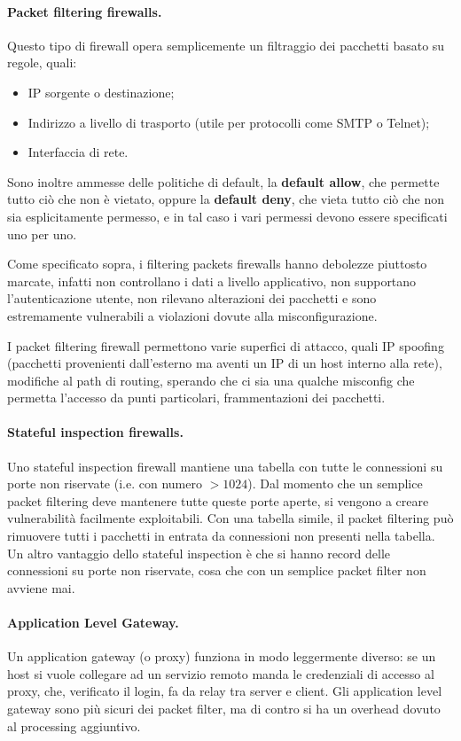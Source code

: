 \documentclass[a4paper, 10pt, twoside]{article}
\begin{document}
	\paragraph{Packet filtering firewalls.}
	Questo tipo di firewall opera semplicemente un filtraggio dei pacchetti basato su regole, quali: \begin{itemize}
		\item IP sorgente o destinazione;
		\item Indirizzo a livello di trasporto (utile per protocolli come SMTP o  Telnet);
		\item Interfaccia di rete.
	\end{itemize}

	Sono inoltre ammesse delle politiche di default, la \textbf{default allow}, che permette tutto ciò che non è vietato, oppure la \textbf{default deny}, che vieta tutto ciò che non sia esplicitamente permesso, e in tal caso i vari permessi devono essere specificati uno per uno.

	Come specificato sopra, i filtering packets firewalls hanno debolezze piuttosto marcate, infatti non controllano i dati a livello applicativo, non supportano l'autenticazione utente, non rilevano alterazioni dei pacchetti e sono estremamente vulnerabili a violazioni dovute alla misconfigurazione.

	I packet filtering firewall permettono varie superfici di attacco, quali IP spoofing (pacchetti provenienti dall'esterno ma aventi un IP di un host interno alla rete), modifiche al path di routing, sperando che ci sia una qualche misconfig che permetta l'accesso da punti particolari, frammentazioni dei pacchetti.

	
	\paragraph{Stateful inspection firewalls.}
	Uno stateful inspection firewall mantiene una tabella con tutte le connessioni su porte non riservate (i.e. con numero $ > 1024$). Dal momento che un semplice packet filtering deve mantenere tutte queste porte aperte, si vengono a creare vulnerabilità facilmente exploitabili. Con una tabella simile, il packet filtering può rimuovere tutti i pacchetti in entrata da connessioni non presenti nella tabella.
	Un altro vantaggio dello stateful inspection è che si hanno record delle connessioni su porte non riservate, cosa che con un semplice packet filter non avviene mai.

	\paragraph{Application Level Gateway.} Un application gateway (o proxy) funziona in modo leggermente diverso: se un host si vuole collegare ad un servizio remoto manda le credenziali di accesso al proxy, che, verificato il login, fa da relay tra server e client. Gli application level gateway sono più sicuri dei packet filter, ma di contro si ha un overhead dovuto al processing aggiuntivo.
\end{document}
